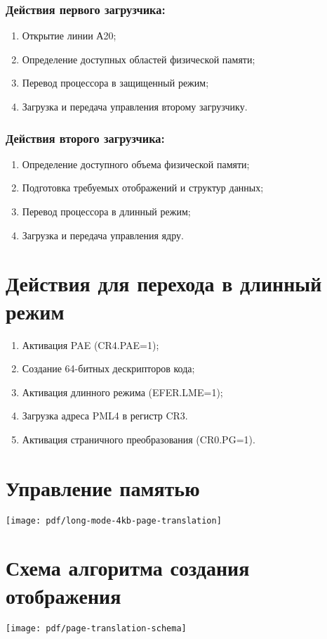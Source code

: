 \documentclass[12pt]{article}
\begin{document}
\subsubsection{Действия первого загрузчика:}
\begin{enumerate}
\item Открытие линии А20;
\item Определение доступных областей физической памяти;
\item Перевод процессора в защищенный режим;
\item Загрузка и передача управления второму загрузчику.
\end{enumerate}

\subsubsection{Действия второго загрузчика:}
\begin{enumerate}
\item Определение доступного объема физической памяти;
\item Подготовка требуемых отображений и структур данных;
\item Перевод процессора в длинный режим;
\item Загрузка и передача управления ядру.
\end{enumerate}


\section{\textbf{Действия для перехода в длинный режим}}
\begin{enumerate}
\item Активация PAE (CR4.PAE=1);
\item Создание 64-битных дескрипторов кода;
\item Активация длинного режима (EFER.LME=1);
\item Загрузка адреса PML4 в регистр CR3.
\item Активация страничного преобразования (CR0.PG=1).
\end{enumerate}


\section{\textbf{Управление памятью}}
\texttt{[image: pdf/long-mode-4kb-page-translation]}


\section{\textbf{Схема алгоритма создания отображения}}
\begin{center}
\texttt{[image: pdf/page-translation-schema]}
\end{center}
\end{document}
